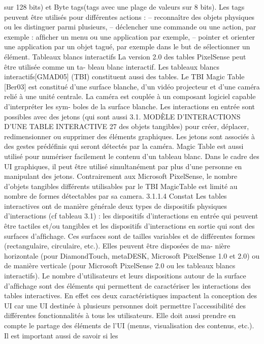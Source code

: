 \documentclass{article}
\begin{document}
sur 128 bits) et Byte tags(tags avec une plage de valeurs sur 8 bits). Les tags peuvent être utilisés pour
différentes actions :
– reconnaître des objets physiques ou les distinguer parmi plusieurs,
– déclencher une commande ou une action, par exemple : afﬁcher un menu ou une application
par exemple,
– pointer et orienter une application par un objet tagué, par exemple dans le but de sélectionner
un élément.
Tableaux blancs interactifs
La version 2.0 des tables PixelSense peut être utilisée comme un ta-
bleau blanc interactif. Les tableaux blancs interactifs[GMAD05] (TBI) constituent aussi des tables. Le
TBI Magic Table [Ber03] est constitué d’une surface blanche, d’un vidéo projecteur et d’une caméra
relié à une unité centrale. La caméra est couplée à un composant logiciel capable d’interpréter les sym-
boles de la surface blanche. Les interactions en entrée sont possibles avec des jetons (qui sont aussi
3.1. MODÈLE D’INTERACTIONS D’UNE TABLE INTERACTIVE
27
des objets tangibles) pour créer, déplacer, redimensionner ou supprimer des éléments graphiques. Les
jetons sont associés à des gestes prédéﬁnis qui seront détectés par la caméra.
Magic Table est aussi utilisé pour numériser facilement le contenu d’un tableau blanc. Dans le
cadre des UI graphiques, il peut être utilisé simultanément par plus d’une personne en manipulant des
jetons. Contrairement aux Microsoft PixelSense, le nombre d’objets tangibles différents utilisables
par le TBI MagicTable est limité au nombre de formes détectables par sa camera.
3.1.1.4
Constat
Les tables interactives ont de manière générale deux types de dispositifs physiques d’interactions
(cf tableau 3.1) : les dispositifs d’interactions en entrée qui peuvent être tactiles et/ou tangibles et
les dispositifs d’interactions en sortie qui sont des surfaces d’afﬁchage. Ces surfaces sont de tailles
variables et de différentes formes (rectangulaire, circulaire, etc.). Elles peuvent être disposées de ma-
nière horizontale (pour DiamondTouch, metaDESK, Microsoft PixelSense 1.0 et 2.0) ou de manière
verticale (pour Microsoft PixelSense 2.0 ou les tableaux blancs interactifs).
Le nombre d’utilisateurs et leurs dispositions autour de la surface d’afﬁchage sont des éléments
qui permettent de caractériser les interactions des tables interactives. En effet ces deux caractéristiques
impactent la conception des UI car une UI destinée à plusieurs personnes doit permettre l’accessibilité
des différentes fonctionnalités à tous les utilisateurs. Elle doit aussi prendre en compte le partage
des éléments de l’UI (menus, visualisation des contenus, etc.). Il est important aussi de savoir si les
\end{document}
